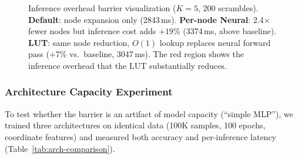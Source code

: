 \documentclass[conference]{IEEEtran}
\begin{document}
\begin{figure}[t]
\caption{Inference overhead barrier visualization ($K{=}5$, 200 scrambles). \textbf{Default}: node expansion only (2843\,ms). \textbf{Per-node Neural}: 2.4$\times$ fewer nodes but inference cost adds $+19\%$ (3374\,ms, above baseline). \textbf{LUT}: same node reduction, $O(1)$ lookup replaces neural forward pass ($+$7\% vs.\ baseline, 3047\,ms). The red region shows the inference overhead that the LUT substantially reduces.}
\label{fig:overhead-barrier}
\end{figure}

\subsubsection{Architecture Capacity Experiment}
\label{sec:arch-comparison}

To test whether the barrier is an artifact of model capacity (``simple MLP''), we trained three architectures on identical data (100K samples, 100 epochs, coordinate features) and measured both accuracy and per-inference latency (Table~\ref{tab:arch-comparison}).

\begin{table}[htbp]
\centering
\caption{Architecture comparison: accuracy vs.\ inference cost (100K samples, coordinate features).}
\label{tab:arch-comparison}
\end{table}
\end{document}
